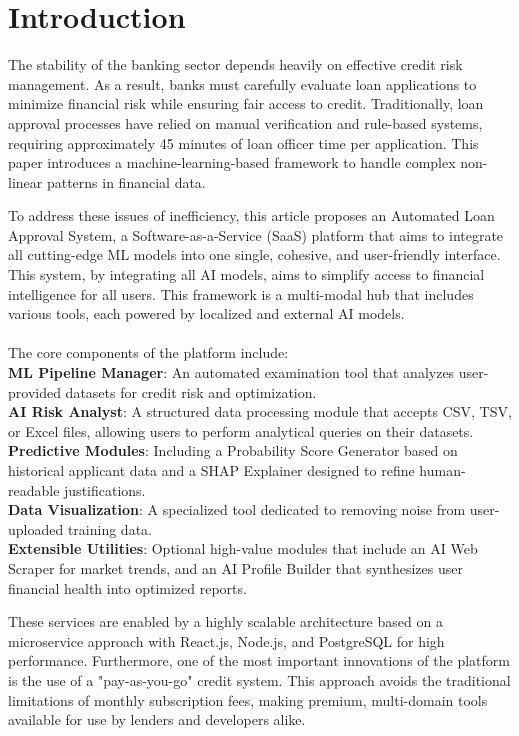 \documentclass[conference]{IEEEtran}
\begin{document}
\section{Introduction}
The stability of the banking sector depends heavily on effective credit risk management. As a result, banks must carefully evaluate loan applications to minimize financial risk while ensuring fair access to credit. Traditionally, loan approval processes have relied on manual verification and rule-based systems, requiring approximately 45 minutes of loan officer time per application. This paper introduces a machine-learning-based framework to handle complex non-linear patterns in financial data.\\
\par To address these issues of inefficiency, this article proposes an Automated Loan Approval System, a Software-as-a-Service (SaaS) platform that aims to integrate all cutting-edge ML models into one single, cohesive, and user-friendly interface. This system, by integrating all AI models, aims to simplify access to financial intelligence for all users. This framework is a multi-modal hub that includes various tools, each powered by localized and external AI models.\\\\
The core components of the platform include:\\
\textbf{ML Pipeline Manager}: An automated examination tool that analyzes user-provided datasets for credit risk and optimization.\\
\textbf{AI Risk Analyst}: A structured data processing module that accepts CSV, TSV, or Excel files, allowing users to perform analytical queries on their datasets.\\
\textbf{Predictive Modules}: Including a Probability Score Generator based on historical applicant data and a SHAP Explainer designed to refine human-readable justifications.\\
\textbf{Data Visualization}: A specialized tool dedicated to removing noise from user-uploaded training data.\\
\textbf{Extensible Utilities}: Optional high-value modules that include an AI Web Scraper for market trends, and an AI Profile Builder that synthesizes user financial health into optimized reports.

\par These services are enabled by a highly scalable architecture based on a microservice approach with React.js, Node.js, and PostgreSQL for high performance. Furthermore, one of the most important innovations of the platform is the use of a "pay-as-you-go" credit system. This approach avoids the traditional limitations of monthly subscription fees, making premium, multi-domain tools available for use by lenders and developers alike. 
\end{document}
